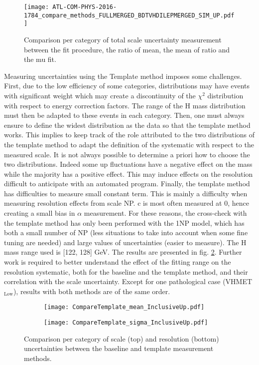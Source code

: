 \begin{enumerate}
\begin{figure}[htbp]
\centering
\texttt{[image: ATL-COM-PHYS-2016-1784\_compare\_methods\_FULLMERGED\_BDTVHDILEPMERGED\_SIM\_UP.pdf]}
\caption{\label{fig:org41d73b3}
Comparison per category of total scale uncertainty measurement between the fit procedure, the ratio of mean, the mean of ratio and the mu fit.}
\end{figure}

Measuring uncertainties using the Template method imposes some challenges.
First, due to the low efficiency of some categories, distributions may have events with significant weight which may create a discontinuity of the \(\chi^{\text{2}}\) distribution with respect to energy correction factors.
The range of the H mass distribution must then be adapted to these events in each category.
Then, one must always ensure to define the widest distribution as the data so that the template method works.
This implies to keep track of the role attributed to the two distributions of the template method to adapt the definition of the systematic with respect to the measured scale.
It is not always possible to determine a priori how to choose the two distributions.
Indeed some up fluctuations have a negative effect on the mass while the majority has a positive effect.
This may induce effects on the resolution difficult to anticipate with an automated program.
Finally, the template method has difficulties to measure small constant term.
This is mainly a difficulty when measuring resolution effects from scale NP.
c is most often measured at 0, hence creating a small bias in $\alpha$ measurement.
For these reasons, the cross-check with the template method has only been performed with the 1NP model, which has both a small number of NP (less situations to take into account when some fine tuning are needed) and large values of uncertainties (easier to measure).
The H mass range used is [122, 128] GeV.
The results are presented in fig. \ref{orgff41d01}.
Further work is required to better understand the effect of the fitting range on the resolution systematic, both for the baseline and the template method, and their correlation with the scale uncertainty.
Except for one pathological case (VHMET\(_{\text{Low}}\)), results with both methods are of the same order.

\begin{figure}
\begin{subfigure}[t]{\linewidth}
\begin{center}
\texttt{[image: CompareTemplate\_mean\_InclusiveUp.pdf]}
\end{center}
\end{subfigure}
\begin{subfigure}[t]{\linewidth}
\begin{center}
\texttt{[image: CompareTemplate\_sigma\_InclusiveUp.pdf]}
\end{center}
\end{subfigure}
\caption{\label{orgff41d01}
Comparison per category of scale (top) and resolution (bottom) uncertainties between the baseline and template measurement methods.}
\end{figure}



\end{enumerate}
